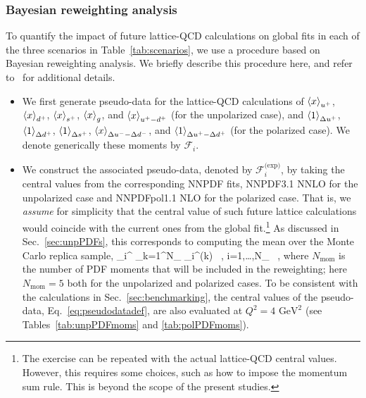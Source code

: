 \subsubsection{Bayesian reweighting analysis}
\label{sec:projections:rw}

To quantify the impact of future lattice-QCD calculations on global fits 
in each of the three scenarios in Table~\ref{tab:scenarios},
we use a procedure based on Bayesian reweighting analysis.
%
We briefly describe this procedure here, and refer 
to~\cite{Ball:2011gg,Ball:2010gb} for additional details.

\begin{itemize}

\item We first generate pseudo-data for the lattice-QCD calculations
of $\left\langle x\right\rangle_{u^+}$, $\left\langle x\right\rangle_{d^+}$, $\left\langle x\right\rangle_{s^+}$,
$\left\langle x\right\rangle_{g}$, and $\left\langle x\right\rangle_{u^+-d^+}$ (for the unpolarized case), and
$\left\langle 1\right\rangle_{\Delta u^+}$, $\left\langle 1\right\rangle_{\Delta d^+}$,
$\left\langle 1\right\rangle_{\Delta s^+}$, $\left\langle x\right\rangle_{\Delta u^--\Delta d^-}$, and
$\left\langle 1\right\rangle_{\Delta u^+ - \Delta d^+}$ (for the polarized case).
%
We denote generically these moments by $\mathcal{F}_i$.
  
\item We construct the associated pseudo-data, denoted by 
$\mathcal{F}_i^\text{(exp)}$, by taking the central values from
the corresponding NNPDF fits, NNPDF3.1 NNLO for the unpolarized case and 
NNPDFpol1.1 NLO for the polarized case.
%
That is, we {\it assume} for simplicity that the central value
of such future lattice calculations would coincide with the current ones
from the global fit.\footnote{ The exercise can be repeated
 with the actual lattice-QCD central values. However, this 
 requires some choices, such as how to impose 
 the momentum sum rule.
 This is beyond the scope of the present studies.}
%
As discussed in Sec.~\ref{sec:unpPDFs}, this corresponds to computing
the mean over the Monte Carlo replica sample,
\be
\label{eq:pseudodatadef}
_i^ \equiv {}\sum_{k=1}^{N_}
_i^{(k)} \, , \quad i=1,\ldots,N_ \, ,
\ee
where $N_\text{mom}$ is the number of PDF moments that will be included
in the reweighting; here $N_\text{mom}=5$ both for the unpolarized and 
polarized cases.
%
To be consistent with the calculations in Sec.~\ref{sec:benchmarking},
the central values of the pseudo-data, Eq.~\eqref{eq:pseudodatadef},
are also evaluated at $Q^2=4\text{ GeV}^2$ 
(see Tables~\ref{tab:unpPDFmoms} and \ref{tab:polPDFmoms}).


\end{itemize}
